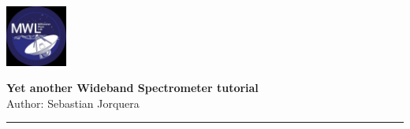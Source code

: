 \documentclass[11pt,letterpaper]{article}
\begin{document}

\usetikzlibrary{positioning}
\pagestyle{plain}
\begin{flushleft}
\underline{}
\end{flushleft}

\begin{flushright}\vspace{-5mm}
\includegraphics[height=2cm]{images/mwl.jpeg}
\end{flushright}
 
\begin{center}\vspace{-1cm}
\textbf{\large Yet another Wideband Spectrometer tutorial}\\   %
Author: Sebastian Jorquera
\end{center}
\rule{\linewidth}{0.1mm}


\newpage

\end{document}
